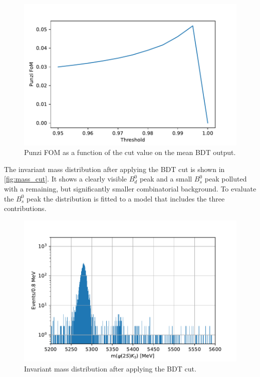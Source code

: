 \begin{figure}[tb]
  \centering
  \includegraphics[width=.8\textwidth]{plots/FoM.pdf}
  \caption{Punzi FOM as a function of the cut value on the mean BDT output.}
  \label{fig:punzi}
\end{figure}

The invariant mass distribution after applying the BDT cut is shown in \autoref{fig:mass_cut}. It shows a clearly visible $B^0_d$ peak and a small $B^0_s$ peak polluted with a remaining, but significantly smaller combinatorial background. To evaluate the $B^0_s$ peak the distribution is fitted to a model that includes the three contributions.

\begin{figure}[tb]
  \centering
  \includegraphics[width=.8\textwidth]{plots/signal_window_cut.pdf}
  \caption{Invariant mass distribution after applying the BDT cut.}
  \label{fig:mass_cut}
\end{figure}

